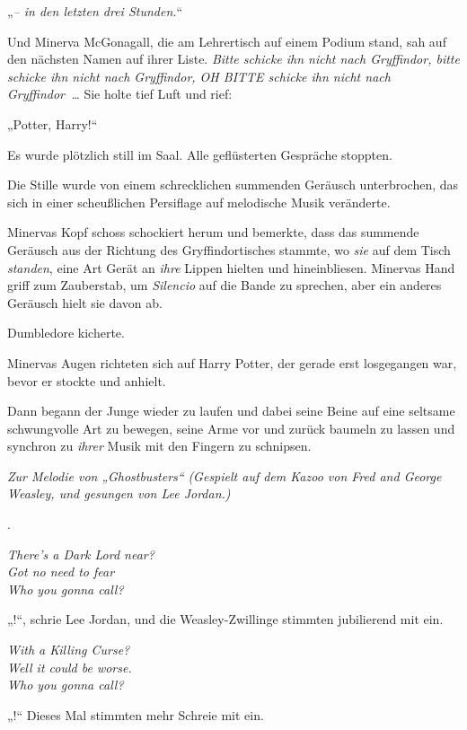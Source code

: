 „\emph{– in den letzten drei Stunden.}“

Und Minerva McGonagall, die am Lehrertisch auf einem Podium stand, sah auf den nächsten Namen auf ihrer Liste. \emph{Bitte schicke ihn nicht nach Gryffindor, bitte schicke ihn nicht nach Gryffindor, OH BITTE schicke ihn nicht nach Gryffindor …} Sie holte tief Luft und rief:

„Potter, Harry!“

Es wurde plötzlich still im Saal. Alle geflüsterten Gespräche stoppten.

Die Stille wurde von einem schrecklichen summenden Geräusch unterbrochen, das sich in einer scheußlichen Persiflage auf melodische Musik veränderte.

Minervas Kopf schoss schockiert herum und bemerkte, dass das summende Geräusch aus der Richtung des Gryffindortisches stammte, wo \emph{sie} auf dem Tisch \emph{standen}, eine Art Gerät an \emph{ihre} Lippen hielten und hineinbliesen. Minervas Hand griff zum Zauberstab, um \emph{Silencio} auf die Bande zu sprechen, aber ein anderes Geräusch hielt sie davon ab.

Dumbledore kicherte.

Minervas Augen richteten sich auf Harry Potter, der gerade erst losgegangen war, bevor er stockte und anhielt.

Dann begann der Junge wieder zu laufen und dabei seine Beine auf eine seltsame schwungvolle Art zu bewegen, seine Arme vor und zurück baumeln zu lassen und synchron zu \emph{ihrer} Musik mit den Fingern zu schnipsen.

\begin{center}
\emph{Zur Melodie von „Ghostbusters“}
\emph{(Gespielt auf dem Kazoo von Fred and George Weasley,
und gesungen von Lee Jordan.)}

.

\emph{There's a Dark Lord near?\\
Got no need to fear\\
Who you gonna call?}
\end{center}

„!“, schrie Lee Jordan, und die Weasley-Zwillinge stimmten jubilierend mit ein.

\begin{center}
\emph{With a Killing Curse?\\
Well it could be worse.\\
Who you gonna call?}
\end{center}

„!“ Dieses Mal stimmten mehr Schreie mit ein.

